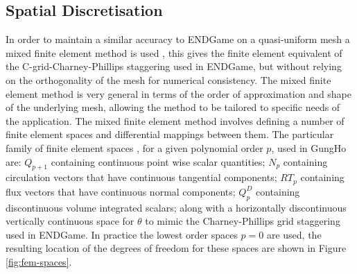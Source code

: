 \documentclass[times]{elsarticle}
\begin{document}
\subsection{Spatial Discretisation\label{sec:sub:spatial}}
In order to maintain a similar
accuracy to ENDGame on a quasi-uniform mesh a mixed finite element method is 
used \citep{cotter2012, natale2016}, this gives the finite element equivalent 
of the C-grid-Charney-Phillips staggering used in ENDGame, but without relying
on the orthogonality of the mesh for numerical consistency. The mixed finite element
method is very general in terms of the order of approximation and shape of the 
underlying mesh, allowing the method to be tailored to specific needs of the 
application. The mixed finite element method involves defining a number of finite 
element spaces and differential mappings between them. The particular family of 
finite element spaces \citep{boffi2013}, for a given polynomial order $p$, used 
in GungHo are: $Q_{p+1}$ containing continuous 
point wise scalar quantities; $N_p$ containing circulation vectors that have
continuous tangential components; $RT_p$ containing flux vectors that have 
continuous normal components; $Q_p^D$ containing discontinuous volume 
integrated scalars; along with a horizontally discontinuous vertically continuous 
space \citep{natale2016} for $\theta$ to mimic the Charney-Phillips grid staggering 
used in ENDGame.  In practice the lowest order spaces $p=0$ are used, the resulting
location of the degrees of freedom for these spaces are shown in
Figure \ref{fig:fem-spaces}. 
%
\end{document}
